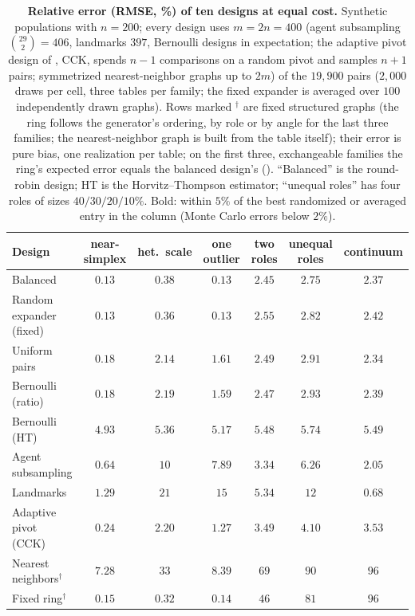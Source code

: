 \documentclass[twoside,11pt]{article}
\begin{document}
\begin{table}[t]
\centering
\footnotesize
\setlength{\tabcolsep}{4.2pt}
\caption{\textbf{Relative error (RMSE, \%) of ten designs at equal cost.}
Synthetic populations with $n=200$; every design uses $m=2n=400$
(agent subsampling $\binom{29}{2}=406$, landmarks $397$, Bernoulli designs
in expectation; the adaptive pivot design of \citet{chechik2015average}, CCK,
spends $n-1$ comparisons on a random pivot and samples $n+1$ pairs; symmetrized nearest-neighbor graphs up to $2m$) of the
$19{,}900$ pairs ($2{,}000$ draws per cell, three tables per family; the
fixed expander is averaged over $100$ independently drawn graphs). Rows
marked $^\dagger$ are fixed structured graphs (the ring follows the generator's
ordering, by role or by angle for the last three families; the
nearest-neighbor graph is built from the table itself); their error is
pure bias, one realization per table; on the first three, exchangeable
families the ring's expected error equals the balanced design's (). ``Balanced'' is the round-robin design; HT is the Horvitz--Thompson estimator; ``unequal roles'' has
four roles of sizes $40/30/20/10\%$. Bold: within $5\%$ of the best randomized or averaged entry in the column (Monte Carlo errors below $2\%$).}
\label{tab:e2}
\begin{tabular}{@{}lcccccc@{}}
\toprule
Design & near-simplex & het.\ scale & one outlier & two roles & unequal roles & continuum \\
\midrule
Balanced & $\mathbf{0.13}$ & $0.38$ & $\mathbf{0.13}$ & $\mathbf{2.45}$ & $\mathbf{2.75}$ & $2.37$ \\
Random expander (fixed) & $\mathbf{0.13}$ & $\mathbf{0.36}$ & $\mathbf{0.13}$ & $\mathbf{2.55}$ & $\mathbf{2.82}$ & $2.42$ \\
Uniform pairs & $0.18$ & $2.14$ & $1.61$ & $\mathbf{2.49}$ & $2.91$ & $2.34$ \\
Bernoulli (ratio) & $0.18$ & $2.19$ & $1.59$ & $\mathbf{2.47}$ & $2.93$ & $2.39$ \\
Bernoulli (HT) & $4.93$ & $5.36$ & $5.17$ & $5.48$ & $5.74$ & $5.49$ \\
Agent subsampling & $0.64$ & $10$ & $7.89$ & $3.34$ & $6.26$ & $2.05$ \\
Landmarks & $1.29$ & $21$ & $15$ & $5.34$ & $12$ & $\mathbf{0.68}$ \\
Adaptive pivot (CCK) & $0.24$ & $2.20$ & $1.27$ & $3.49$ & $4.10$ & $3.53$ \\
Nearest neighbors$^\dagger$ & $7.28$ & $33$ & $8.39$ & $69$ & $90$ & $96$ \\
Fixed ring$^\dagger$ & $0.15$ & $0.32$ & $0.14$ & $46$ & $81$ & $96$ \\
\bottomrule
\end{tabular}
\end{table}
\end{document}
